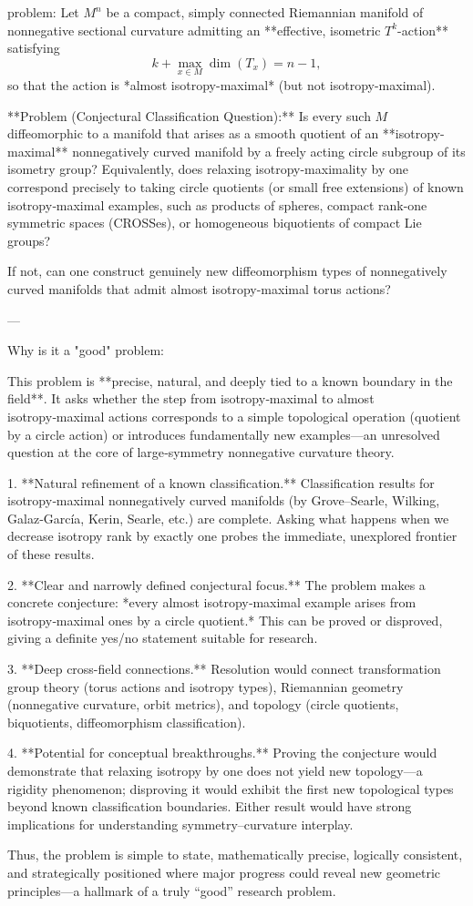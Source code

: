 problem:  
Let \( M^n \) be a compact, simply connected Riemannian manifold of nonnegative sectional curvature admitting an **effective, isometric \( T^k \)-action** satisfying  
\[
k + \max_{x \in M} \dim(T_x) = n - 1,
\]
so that the action is *almost isotropy-maximal* (but not isotropy-maximal).  

**Problem (Conjectural Classification Question):**  
Is every such \( M \) diffeomorphic to a manifold that arises as a smooth quotient of an **isotropy-maximal** nonnegatively curved manifold by a freely acting circle subgroup of its isometry group?  
Equivalently, does relaxing isotropy-maximality by one correspond precisely to taking circle quotients (or small free extensions) of known isotropy‑maximal examples, such as products of spheres, compact rank-one symmetric spaces (CROSSes), or homogeneous biquotients of compact Lie groups?  

If not, can one construct genuinely new diffeomorphism types of nonnegatively curved manifolds that admit almost isotropy-maximal torus actions?  

---

Why is it a "good" problem:  

This problem is **precise, natural, and deeply tied to a known boundary in the field**. It asks whether the step from isotropy‑maximal to almost isotropy‑maximal actions corresponds to a simple topological operation (quotient by a circle action) or introduces fundamentally new examples—an unresolved question at the core of large‑symmetry nonnegative curvature theory.  

1. **Natural refinement of a known classification.** Classification results for isotropy‑maximal nonnegatively curved manifolds (by Grove–Searle, Wilking, Galaz‑García, Kerin, Searle, etc.) are complete. Asking what happens when we decrease isotropy rank by exactly one probes the immediate, unexplored frontier of these results.  

2. **Clear and narrowly defined conjectural focus.** The problem makes a concrete conjecture: *every almost isotropy‑maximal example arises from isotropy‑maximal ones by a circle quotient.* This can be proved or disproved, giving a definite yes/no statement suitable for research.  

3. **Deep cross-field connections.** Resolution would connect transformation group theory (torus actions and isotropy types), Riemannian geometry (nonnegative curvature, orbit metrics), and topology (circle quotients, biquotients, diffeomorphism classification).  

4. **Potential for conceptual breakthroughs.** Proving the conjecture would demonstrate that relaxing isotropy by one does not yield new topology—a rigidity phenomenon; disproving it would exhibit the first new topological types beyond known classification boundaries. Either result would have strong implications for understanding symmetry–curvature interplay.  

Thus, the problem is simple to state, mathematically precise, logically consistent, and strategically positioned where major progress could reveal new geometric principles—a hallmark of a truly “good” research problem.